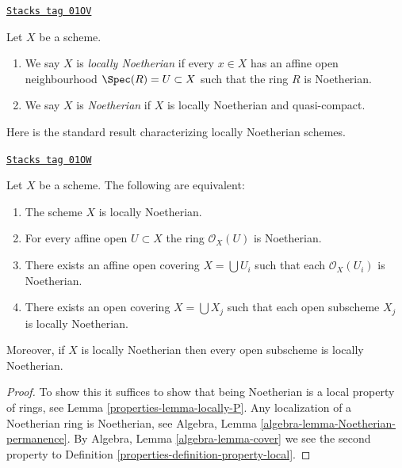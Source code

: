 \begin{definition}[Noetherian]
\label{properties-definition-noetherian}
\href{https://stacks.math.columbia.edu/tag/01OV}{\texttt{Stacks tag 01OV}}

Let $X$ be a scheme.
\begin{enumerate}
\item We say $X$ is {\it locally Noetherian} if every
$x \in X$ has an affine open neighbourhood
$\Spec(R) = U \subset X$ such that the ring $R$ is Noetherian.
\item We say $X$ is {\it Noetherian} if $X$ is locally Noetherian
and quasi-compact.
\end{enumerate}
\end{definition}

Here is the standard result characterizing locally Noetherian schemes.

\begin{lemma}
\label{properties-lemma-locally-Noetherian}
\href{https://stacks.math.columbia.edu/tag/01OW}{\texttt{Stacks tag 01OW}}

Let $X$ be a scheme. The following are equivalent:
\begin{enumerate}
\item The scheme $X$ is locally Noetherian.
\item For every affine open $U \subset X$ the ring $\mathcal{O}_X(U)$
is Noetherian.
\item There exists an affine open covering $X = \bigcup U_i$ such that
each $\mathcal{O}_X(U_i)$ is Noetherian.
\item There exists an open covering $X = \bigcup X_j$
such that each open subscheme $X_j$ is locally Noetherian.
\end{enumerate}
Moreover, if $X$ is locally Noetherian then every open subscheme
is locally Noetherian.
\end{lemma}

\begin{proof}

To show this it suffices to show that being Noetherian is a local
property of rings, see Lemma \ref{properties-lemma-locally-P}.
Any localization of a Noetherian ring is Noetherian, see
Algebra, Lemma \ref{algebra-lemma-Noetherian-permanence}.
By Algebra, Lemma \ref{algebra-lemma-cover} we see the second
property to Definition \ref{properties-definition-property-local}.
\end{proof}

